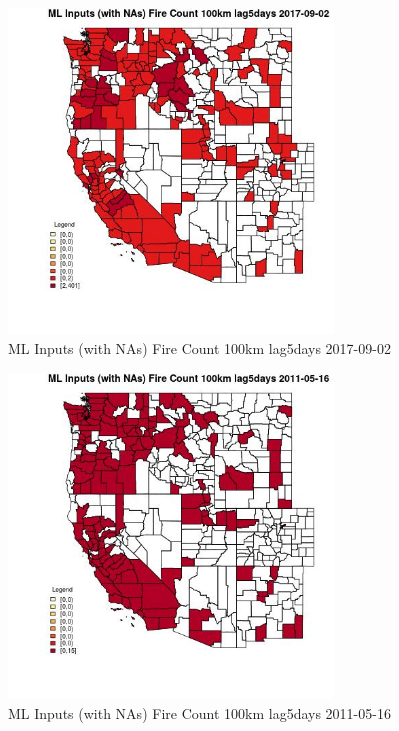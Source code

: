 \begin{figure} 
\centering  
\includegraphics[width=0.77\textwidth]{Code_Outputs/Report_ML_input_PM25_Step4_part_e_de_duplicated_aves_compiled_2019-05-20wNAs_CountyFire_Count_100km_lag5daysMean2017-09-02.jpg} 
\caption{\label{fig:Report_ML_input_PM25_Step4_part_e_de_duplicated_aves_compiled_2019-05-20wNAsCountyFire_Count_100km_lag5daysMean2017-09-02}ML Inputs (with NAs) Fire Count 100km lag5days 2017-09-02} 
\end{figure} 
 

\begin{figure} 
\centering  
\includegraphics[width=0.77\textwidth]{Code_Outputs/Report_ML_input_PM25_Step4_part_e_de_duplicated_aves_compiled_2019-05-20wNAs_CountyFire_Count_100km_lag5daysMean2011-05-16.jpg} 
\caption{\label{fig:Report_ML_input_PM25_Step4_part_e_de_duplicated_aves_compiled_2019-05-20wNAsCountyFire_Count_100km_lag5daysMean2011-05-16}ML Inputs (with NAs) Fire Count 100km lag5days 2011-05-16} 
\end{figure} 
 

